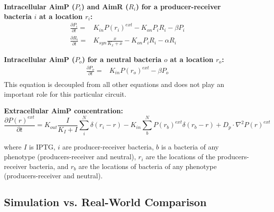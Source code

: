 \documentclass[11pt,a4paper]{article}
\begin{document}
\textbf{Intracellular AimP ($P_i$) and AimR ($R_i$) for a producer-receiver bacteria $i$ at a location $r_i$:}
\begin{align*}
\frac{\partial P_i}{\partial t} =& K_{in} P(r_i)^{ext} - K_{on} P_i R_i - \beta P_i \\
\frac{\partial R_i}{\partial t} =& K_{syn} \frac{x}{K_x + x} - K_{on} P_i R_i - \alpha R_i 
\end{align*}

\textbf{Intracellular AimP ($P_o$)  for a neutral bacteria $o$ at a location $r_o$:}
\begin{align*}
\frac{\partial P_o}{\partial t} =& K_{in} P(r_o)^{ext}  - \beta P_o \\
\end{align*}
This equation is decoupled from all other equations and does not play an important role for this particular circuit.

\textbf{Extracellular AimP concentration:}
\begin{equation}
    \frac{\partial P(r)^{ext}}{\partial t} = K_{out} \frac{I}{K_{I} + I} \sum_{i}^{N} \delta(r_i - r)  - K_{in} \sum_{b}^{N} P(r_b)^{ext}\delta(r_b - r)+ D_p \cdot \nabla^2 P(r)^{ext}
\end{equation}

where $I$ is IPTG, $i$ are producer-receiver bacteria, $b$ is a bacteria of any phenotype (producers-receiver and neutral), $r_i$ are the locations of the producers-receiver bacteria, and 
$r_b$ are the locations of bacteria of any phenotype (producers-receiver and neutral).

\subsection{Simulation vs. Real-World Comparison}
\end{document}
